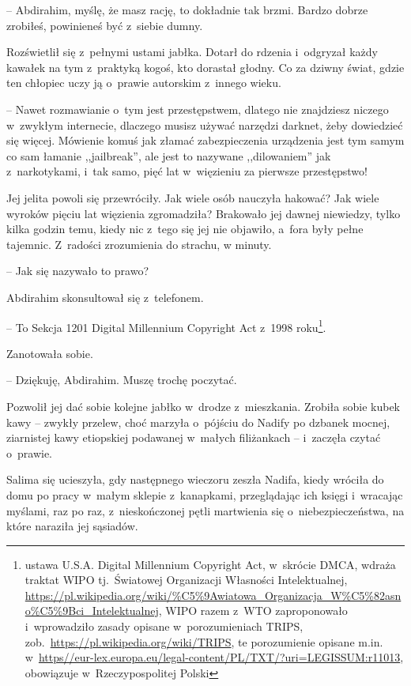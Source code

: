 \documentclass[oneside,polish,11pt,sfheadings]{mwbk}
\begin{document}
-- Abdirahim, myślę,
że masz rację, to dokładnie tak brzmi. Bardzo dobrze zrobiłeś,
powinieneś być z~siebie dumny.

Rozświetlił się z~pełnymi ustami jabłka. Dotarł do rdzenia i~odgryzał
każdy kawałek na tym z~praktyką kogoś, kto dorastał głodny. Co za dziwny
świat, gdzie ten chłopiec uczy ją o~prawie autorskim z~innego wieku.

-- Nawet rozmawianie o~tym jest przestępstwem, dlatego nie znajdziesz
niczego w~zwykłym internecie, dlaczego musisz używać narzędzi darknet,
żeby dowiedzieć się więcej. Mówienie komuś jak złamać zabezpieczenia
urządzenia jest tym samym co sam łamanie ,,jailbreak'', ale jest to
nazywane ,,dilowaniem'' jak z~narkotykami, i~tak samo, pięć lat w~więzieniu za pierwsze przestępstwo!

Jej jelita powoli się przewróciły. Jak wiele osób nauczyła hakować? Jak
wiele wyroków pięciu lat więzienia zgromadziła? Brakowało jej dawnej
niewiedzy, tylko kilka godzin temu, kiedy nic z~tego się jej nie
objawiło, a~fora były pełne tajemnic. Z~radości zrozumienia do strachu,
w minuty.

-- Jak się nazywało to prawo?

Abdirahim skonsultował się z~telefonem. 

-- To Sekcja 1201 Digital
Millennium Copyright Act z~1998 roku\footnote{ ustawa U.S.A. Digital
Millennium Copyright Act, w~skrócie DMCA, wdraża traktat WIPO tj.~Światowej Organizacji Własności Intelektualnej,
\url{https://pl.wikipedia.org/wiki/\%C5\%9Awiatowa\_Organizacja\_W\%C5\%82asno\%C5\%9Bci\_Intelektualnej},
WIPO razem z~WTO zaproponowało i~wprowadziło zasady opisane w~porozumieniach TRIPS,
zob.~\url{https://pl.wikipedia.org/wiki/TRIPS}, te
porozumienie opisane m.in.
w~\url{https//eur-lex.europa.eu/legal-content/PL/TXT/?uri=LEGISSUM:r11013},
obowiązuje w~Rzeczypospolitej Polski}.

Zanotowała sobie. 

-- Dziękuję, Abdirahim. Muszę trochę poczytać.

Pozwolił jej dać sobie kolejne jabłko w~drodze z~mieszkania. Zrobiła
sobie kubek kawy -- zwykły przelew, choć marzyła o~pójściu do Nadify po
dzbanek mocnej, ziarnistej kawy etiopskiej podawanej w~małych
filiżankach -- i~zaczęła czytać o~prawie.

Salima się ucieszyła, gdy następnego wieczoru zeszła Nadifa, kiedy
wróciła do domu po pracy w~małym sklepie z~kanapkami, przeglądając ich
księgi i~wracając myślami, raz po raz, z~nieskończonej pętli martwienia
się o~niebezpieczeństwa, na które naraziła jej sąsiadów.
\end{document}
